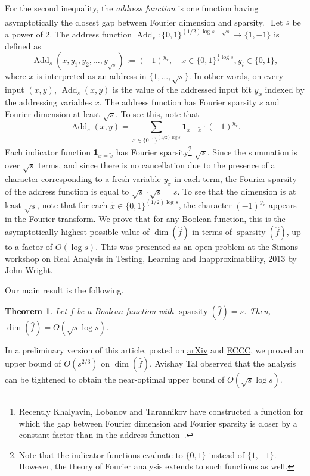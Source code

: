 \documentclass[11pt]{article}
\numberwithin{equation}{section}
\newtheorem{theorem}{Theorem}[section]
\theoremstyle{definition}
\theoremstyle{plain}
\DeclareMathOperator{\spa}{sparsity}
\DeclareMathOperator{\dimn}{dim}
\DeclareMathOperator{\Add}{Add}   %
\begin{document}
For the second inequality, the \textit{address function} is one function
having asymptotically the closest gap between Fourier dimension and sparsity.\footnote{Recently Khalyavin, Lobanov and Tarannikov have constructed a function for which the gap between Fourier dimension and Fourier sparsity is closer by a constant factor than in the address function~\cite{khalyavin}.} Let $s$ be a power of $2$. The address function
 $\Add_s:\{0,1\}^{(1/2) \log s +
  \sqrt{s}}\to \{1,-1\}$ is defined
as $$\Add_s(x,y_1,y_2,\dots,y_{\sqrt{s}}) := (-1)^{y_x}, \quad x \in \{0,1\}^{\frac12\log s}, y_i \in \{0,1\},$$ where $x$ is interpreted as an address in $\{1, \ldots, \sqrt s\}$. In other words, on every input
$(x,y)$, $\Add_s(x,y)$ is the value of the
%
addressed    %
input bit $y_x$
indexed by the addressing variables $x$. The address function has
Fourier sparsity $s$ and Fourier dimension at least $\sqrt{s}$. To see this, note that
\[
  \Add_s(x,y)=\sum_{\tilde{x} \in \{0,1\}^{({1}/{2}) \log s}} \mathbf{1}_{x=\tilde{x}}\cdot (-1)^{y_{\tilde{x}}}.
\]
Each indicator function $\mathbf{1}_{x=\tilde{x}}$ has Fourier
%
%
sparsity\footnote{Note    %
  that the indicator functions evaluate to $\{0,1\}$ instead of $\{1,-1\}$. However, the theory of Fourier analysis extends to such functions as well.}
$\sqrt{s}$.   %
Since the summation is over $\sqrt{s}$ terms, and since there is no
%
%
cancellation due to the presence of a character corresponding to a fresh variable $y_{\tilde{x}}$ in each term, the Fourier sparsity of the address function is equal to $\sqrt s\cdot \sqrt s=s$. To see that the dimension is at least $\sqrt{s}$, note that for each $\tilde{x} \in \{0,1\}^{({1}/{2})\log s}$, the character $(-1)^{y_{\tilde{x}}}$ appears in the Fourier transform.
%
%
We prove that for any Boolean function, this is the asymptotically highest possible value of $\dimn(\widehat{f})$ in terms of
$\spa(\widehat{f})$, up to a factor of $O(\log s)$. This was presented as an open problem at the Simons workshop on Real Analysis in Testing, Learning and Inapproximability, 2013 by John Wright.

Our main result is the following. %

\begin{theorem}
 \label{thm:th1}
Let $f$ be a Boolean function with $\spa(\widehat{f})=s$. Then, $\dimn(\widehat{f})=O\left(\sqrt{s} \log s \right)$.
\end{theorem}

%
In a  %
preliminary version of this
%
article, %
%
%
posted on \href{http://arxiv.org/abs/1407.3500}{arXiv} and   %
\href{https://eccc.weizmann.ac.il/report/2014/088/}{ECCC},   %
we proved an upper bound of $O(s^{2/3})$ on $\dimn(\widehat{f})$.
Avishay Tal observed that the analysis can be tightened to
%
obtain  %
the
near-optimal upper bound of $O\left(\sqrt{s} \log s \right)$.
\end{document}
